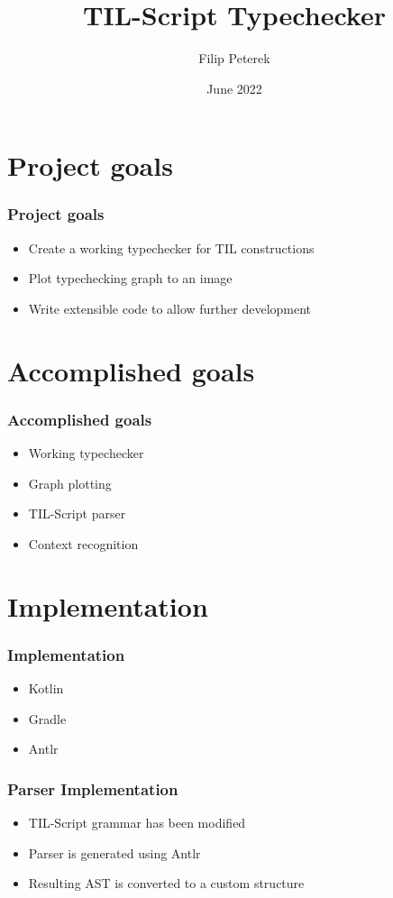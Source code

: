\documentclass{beamer}
\title{TIL-Script Typechecker}
\author{Filip Peterek}
\institute{Technical University of Ostrava}
\date{June 2022}
\begin{document}
\frame{\titlepage}

\section{Project goals}

\begin{frame}
    \frametitle{Project goals}
    \begin{itemize}
        \item Create a working typechecker for TIL constructions
        \item Plot typechecking graph to an image
        \item Write extensible code to allow further development
    \end{itemize}
\end{frame}

\section{Accomplished goals}

\begin{frame}
    \frametitle{Accomplished goals}
    \begin{itemize}
        \item Working typechecker
        \item Graph plotting
        \item TIL-Script parser
        \item Context recognition
    \end{itemize}
\end{frame}

\section{Implementation}

\begin{frame}
    \frametitle{Implementation}
    \begin{itemize}
        \item Kotlin
        \item Gradle
        \item Antlr
    \end{itemize}
\end{frame}

\begin{frame}
    \frametitle{Parser Implementation}
    \begin{itemize}
        \item TIL-Script grammar has been modified
        \item Parser is generated using Antlr
        \item Resulting AST is converted to a custom structure
    \end{itemize}
\end{frame}
\end{document}
